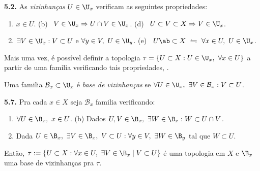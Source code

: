 \hypertarget{prop52}{}
\begin{proposition}
    \textbf{5.2.} As \emph{vizinhanças} \(U \in \U_x\) verificam as seguintes propriedades: 
\vspace{-0.2cm}
    \begin{enumerate}[label = (\alph*), left = 0.6cm]
        \item \(x \in U\). \hfill  (b) \ \( V \in \U_x \Rightarrow U\cap V \in \U_x\). \hfill (d) \ \(U \subset V\subset X \Rightarrow V \in \U_x\).
        \item[(c)] \(\exists V \in \U_x : V\subset U\) e \(\forall y \in V, \ U \in \U_y\). \hfill (e) \  \(U\ab\subset X \ \leftrightharpoons \ \forall x \in U, \  U \in \U_x\). 
    \end{enumerate}
\end{proposition}
\begin{note}
    Mais uma vez, é possível definir a topologia \(\tau = \{U \subset X : U \in \U_x, \ \forall x \in U\}\) a partir de uma familia verificando tais propriedades, \cite[Pág. 12]{mujica2005}.
\end{note}

\begin{definition}
    Uma familia \(\mathcal{B}_x\subset \U_x\) é \emph{base de vizinhanças} se \(\forall U \in \U_x, \ \exists V \in \mathcal{B}_x : V \subset U\). 
\end{definition}

\begin{proposition}
    \textbf{5.7.} Pra cada \(x \in X \) seja \(\mathcal{B}_x\) familia verificando: 
    \vspace{-0.2cm}
    \begin{enumerate}[label = (\alph*), left = 0.6cm ]
        \item \(\forall U \in \B_x, \ x \in U\). \hfill (b) Dados \(U,V \in \B_x, \ \exists W \in \B_x : W \subset U \cap V\). 
        \item[(c)] Dada \(U \in \B_x, \ \exists V \in \B_x, \ V\subset U : \forall y \in V, \ \exists W \in \B_y \) tal que \( W \subset U\). 
    \end{enumerate}
    Então, \(\tau := \{U \subset X : \forall x \in U, \ \exists V \in \B_x \mid V \subset U\}\) é uma topologia em \(X\) e \(\B_x\) uma base de vizinhanças pra \(\tau\). 
\end{proposition}

